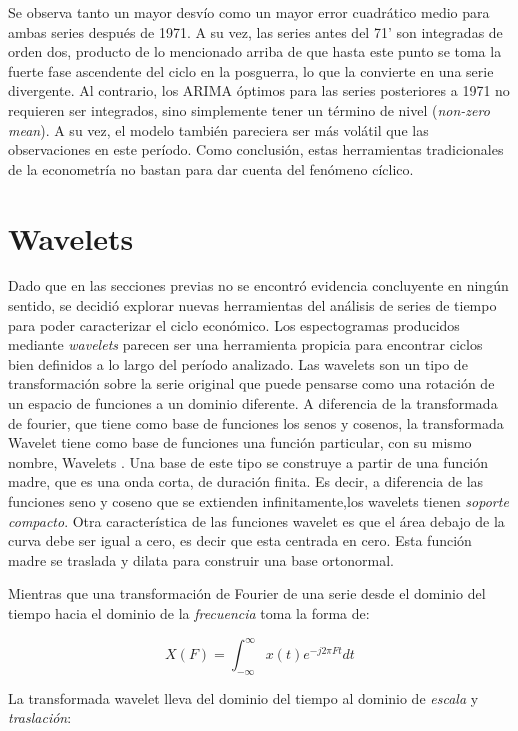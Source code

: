\documentclass[a4paper]{article}
\begin{document}
Se observa tanto un mayor desvío como un mayor error cuadrático medio para ambas series después de 1971. A su vez, las series antes del 71' son integradas de orden dos, producto de lo mencionado arriba de que hasta este punto se toma la fuerte fase ascendente del ciclo en la posguerra, lo que la convierte en una serie divergente. Al contrario, los ARIMA óptimos para las series posteriores a 1971 no requieren ser integrados, sino simplemente tener un término de nivel (\textit{non-zero mean}). A su vez, el modelo también pareciera ser más volátil que las observaciones en este período. Como conclusión, estas herramientas tradicionales de la econometría no bastan para dar cuenta del fenómeno cíclico. 

\section{Wavelets}

Dado que en las secciones previas no se encontró evidencia concluyente en ningún sentido, se decidió explorar nuevas herramientas del análisis de series de tiempo para poder caracterizar el ciclo económico. Los espectogramas producidos mediante \textit{wavelets} parecen ser una herramienta propicia para encontrar ciclos bien definidos a lo largo del período analizado. Las wavelets son un tipo de transformación sobre la serie original que puede pensarse como una rotación de un espacio de funciones a un dominio diferente. A diferencia de la transformada de fourier, que tiene como base de funciones los senos y cosenos, la transformada Wavelet tiene como base de funciones una función particular, con su mismo nombre, Wavelets \cite{castro1995wavelets}. Una base de este tipo se construye a partir de una función madre, que es una onda corta, de duración finita. Es decir, a diferencia de las funciones seno y coseno que se extienden infinitamente,los wavelets tienen \textit{soporte compacto}. Otra característica de las funciones wavelet es que el área debajo de la curva debe ser igual a cero, es decir que esta centrada en cero. Esta función madre se traslada y dilata para construir una base ortonormal. 

Mientras que una transformación de Fourier de una serie desde el dominio del tiempo hacia el dominio de la \textit{frecuencia} toma la forma de:

$$
X(F)=\int_{-\infty}^{\infty} x(t) e^{-j2\pi Ft}dt
$$

La transformada wavelet lleva del dominio del tiempo al dominio de \textit{escala} y \textit{traslación}:
\end{document}
